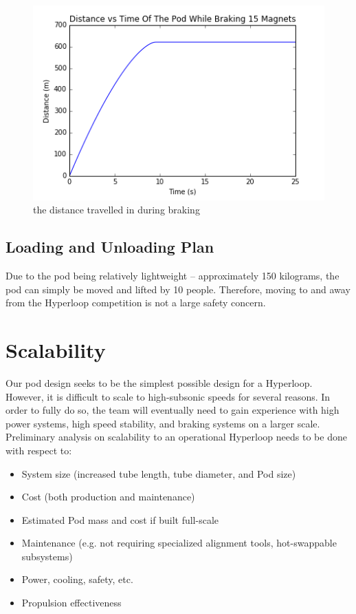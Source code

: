 \documentclass[main.tex]{subfiles}
\begin{document}
\begin{flushleft}
    \begin{figure}[H]
        \centering
        \includegraphics[width=\linewidth]{images/distance_time_graph}
        \caption{the distance travelled in during braking}
        \label{fig:distance-profile}
    \end{figure}

\subsection{Loading and Unloading Plan}
Due to the pod being relatively lightweight – approximately 150 kilograms, the pod can simply be moved and lifted by 10 people. Therefore, moving to and away from the Hyperloop competition is not a large safety concern.

\section{Scalability}
Our pod design seeks to be the simplest possible design for a Hyperloop. However, it is difficult to scale to high-subsonic speeds for several reasons.
In order to fully do so, the team will eventually need to gain experience with high power systems, high speed stability, and braking systems on a larger scale.\\

Preliminary analysis on scalability to an operational Hyperloop needs to be done with respect to:
\begin{itemize}
    \item System size (increased tube length, tube diameter, and Pod size)
    \item Cost (both production and maintenance)
    \item Estimated Pod mass and cost if built full-scale
    \item Maintenance (e.g. not requiring specialized alignment tools, hot-swappable subsystems)
    \item Power, cooling, safety, etc.
    \item Propulsion effectiveness
\end{itemize}
\end{flushleft}
\end{document}
